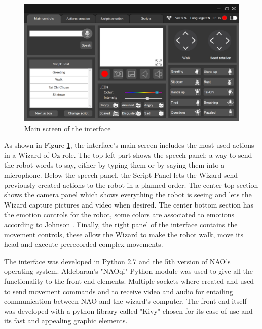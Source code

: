 \documentclass{article}
\begin{document}
        \begin{figure}[ht]
        \centering
        \includegraphics[width=\textwidth]{MainEN.png}
        \caption{Main screen of the interface\label{ref:pantalla1}}
    \end{figure}
    As shown in Figure \ref{ref:pantalla1}, the interface's main screen includes the most used actions in a Wizard of Oz role. The top left part shows the speech panel: a way to send the robot words to say, either by typing them or by saying them into a microphone. Below the speech panel, the Script Panel lets the Wizard send previously created actions to the robot in a planned order. The center top section shows the camera panel which shows everything the robot is seeing and lets the Wizard capture pictures and video when desired. The center bottom section has the emotion controls for the robot, some colors are associated to emotions according to Johnson \cite{emotion}. 
    Finally, the right panel of the interface contains the movement controls, these allow the Wizard to make the robot walk, move its head and execute prerecorded complex movements.\par
    The interface was developed in Python 2.7 and the 5th version of NAO's operating system.
    Aldebaran's "NAOqi" Python module \cite{aldebaran} was used to give all the functionality to the front-end elements. Multiple sockets where created and used to send movement commands and to receive video and audio for entailing communication between NAO and the wizard's computer. The front-end itself was developed with a python library called "Kivy"\cite{kivy} chosen for its ease of use and its fast and appealing graphic elements.\par
    
\end{document}
